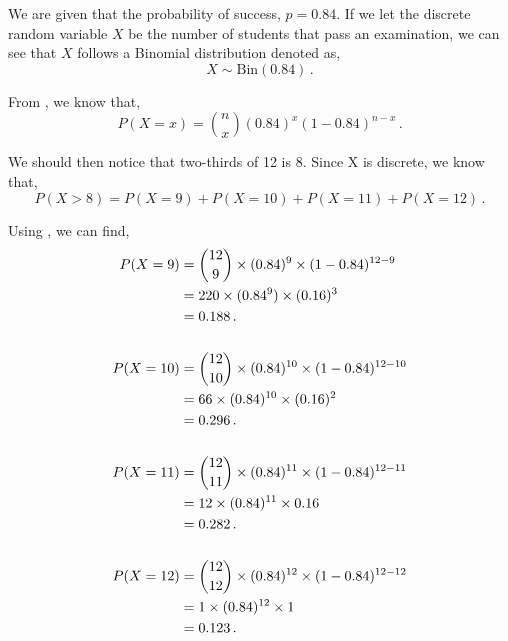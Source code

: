 \begin{subquestions}
\begin{subsubquestions}
\end{subsubquestions}
	
	
\subquestion

We are given that the probability of success, $p=0.84$. If we let the discrete random variable $X$ be the number of students that pass an examination, we can see that $X$ follows a Binomial distribution denoted as,
\begin{equation}
	X \sim \text{Bin}(0.84) \,.
\end{equation} 

From , we know that,
\begin{equation}
	P(X = x) = { n \choose x} (0.84)^x (1-0.84)^{n-x} \,. \label{2011:q4:Bin1}
\end{equation}

We should then notice that two-thirds of 12 is 8. Since X is discrete, we know that,
\begin{equation}
	P(X > 8) = P(X=9)+P(X=10)+P(X=11)+P(X=12) \,. \label{2011:q4:Bin2}
\end{equation}

Using , we can find,
\begin{align}
	P(X=9) & = { 12 \choose 9} \times (0.84)^9 \times (1-0.84)^{12-9} \nonumber \\
	       & = 220 \times (0.84^9) \times (0.16)^3 \nonumber \\
	       & = 0.188 \,. \\ \nonumber \\
	P(X=10) & = { 12 \choose 10} \times (0.84)^{10} \times (1-0.84)^{12-10} \nonumber \\
	        & = 66 \times (0.84)^{10} \times (0.16)^2 \nonumber \\
	        & = 0.296 \,. \\ \nonumber \\
	P(X=11) & = { 12 \choose 11} \times (0.84)^{11} \times (1-0.84)^{12-11} \nonumber \\
	        & = 12 \times (0.84)^{11} \times 0.16 \nonumber \\
	        & = 0.282 \,. \\ \nonumber \\
	P(X=12) & = { 12 \choose 12} \times (0.84)^{12} \times (1-0.84)^{12-12} \nonumber \\
	        & = 1 \times (0.84)^{12} \times 1 \nonumber \\
	        & = 0.123 \,. 
\end{align}


\end{subquestions}
